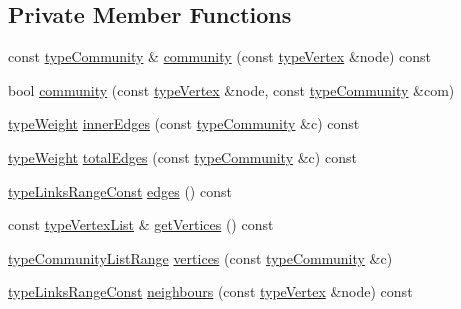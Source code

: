 \subsection*{Private Member Functions}
\begin{DoxyCompactItemize}
\item 
const \hyperlink{graphUndirectedGroupable_8h_a914da95c9ea7f14f4b7f875c36818556}{type\+Community} \& \hyperlink{classAlgorithmLouvain_a5f59777e27ab7a3e5accbc1f52b0e51e}{community} (const \hyperlink{edge_8h_a5fbd20c46956d479cb10afc9855223f6}{type\+Vertex} \&node) const
\item 
bool \hyperlink{classAlgorithmLouvain_a12549c842a87a6f9380ee8226ac58cf8}{community} (const \hyperlink{edge_8h_a5fbd20c46956d479cb10afc9855223f6}{type\+Vertex} \&node, const \hyperlink{graphUndirectedGroupable_8h_a914da95c9ea7f14f4b7f875c36818556}{type\+Community} \&com)
\item 
\hyperlink{edge_8h_a2e7ea3be891ac8b52f749ec73fee6dd2}{type\+Weight} \hyperlink{classAlgorithmLouvain_a066612d0b1d64d8f5c7d84f20bbf70c4}{inner\+Edges} (const \hyperlink{graphUndirectedGroupable_8h_a914da95c9ea7f14f4b7f875c36818556}{type\+Community} \&c) const
\item 
\hyperlink{edge_8h_a2e7ea3be891ac8b52f749ec73fee6dd2}{type\+Weight} \hyperlink{classAlgorithmLouvain_a36a6536611d7c97d16f93245e2271867}{total\+Edges} (const \hyperlink{graphUndirectedGroupable_8h_a914da95c9ea7f14f4b7f875c36818556}{type\+Community} \&c) const
\item 
\hyperlink{graphInterface_8h_ae8d27008f15586bbf419af7ad2e0a48a}{type\+Links\+Range\+Const} \hyperlink{classAlgorithmLouvain_a6d5f1cfcbe2581bbe7bbe285392e0bdf}{edges} () const
\item 
const \hyperlink{graphInterface_8h_a21d54d8a139def524d3b0d6f71ec4974}{type\+Vertex\+List} \& \hyperlink{classAlgorithmLouvain_a627618ba516be4f4906143b6b0ff1c77}{get\+Vertices} () const
\item 
\hyperlink{graphUndirectedGroupable_8h_ad440de7f8b59665f0705cc6f745aab09}{type\+Community\+List\+Range} \hyperlink{classAlgorithmLouvain_a24c9f6d44d422eee2307c55540a8273c}{vertices} (const \hyperlink{graphUndirectedGroupable_8h_a914da95c9ea7f14f4b7f875c36818556}{type\+Community} \&c)
\item 
\hyperlink{graphInterface_8h_ae8d27008f15586bbf419af7ad2e0a48a}{type\+Links\+Range\+Const} \hyperlink{classAlgorithmLouvain_ab6206bfc3cf537277c6965bc0da6d695}{neighbours} (const \hyperlink{edge_8h_a5fbd20c46956d479cb10afc9855223f6}{type\+Vertex} \&node) const

\end{DoxyCompactItemize}
